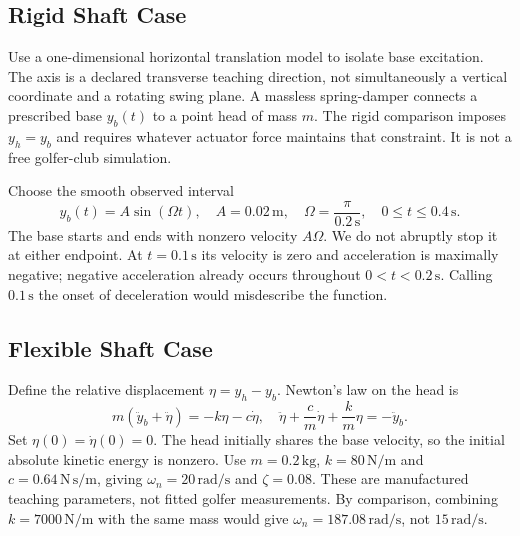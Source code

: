 \subsection{Rigid Shaft Case}
Use a one-dimensional horizontal translation model to isolate base excitation. The axis is a declared transverse teaching direction, not simultaneously a vertical coordinate and a rotating swing plane. A massless spring-damper connects a prescribed base $y_b(t)$ to a point head of mass $m$. The rigid comparison imposes $y_h=y_b$ and requires whatever actuator force maintains that constraint. It is not a free golfer-club simulation.

Choose the smooth observed interval
\[
y_b(t)=A\sin(\Omega t),\quad A=0.02\,\mathrm m,
\quad \Omega=\frac{\pi}{0.2\,\mathrm s},\quad 0\leq t\leq0.4\,\mathrm s.
\]
The base starts and ends with nonzero velocity $A\Omega$. We do not abruptly stop it at either endpoint. At $t=0.1\,\mathrm s$ its velocity is zero and acceleration is maximally negative; negative acceleration already occurs throughout $0<t<0.2\,\mathrm s$. Calling $0.1\,\mathrm s$ the onset of deceleration would misdescribe the function.

\subsection{Flexible Shaft Case}
Define the relative displacement $\eta=y_h-y_b$. Newton's law on the head is
\[
m(\ddot y_b+\ddot\eta)=-k\eta-c\dot\eta,
\quad
\ddot\eta+\frac cm\dot\eta+\frac km\eta=-\ddot y_b.
\]
Set $\eta(0)=\dot\eta(0)=0$. The head initially shares the base velocity, so the initial absolute kinetic energy is nonzero. Use $m=0.2\,\mathrm{kg}$, $k=80\,\mathrm{N/m}$ and $c=0.64\,\mathrm{N\,s/m}$, giving $\omega_n=20\,\mathrm{rad/s}$ and $\zeta=0.08$. These are manufactured teaching parameters, not fitted golfer measurements. By comparison, combining $k=7000\,\mathrm{N/m}$ with the same mass would give $\omega_n=187.08\,\mathrm{rad/s}$, not $15\,\mathrm{rad/s}$.

